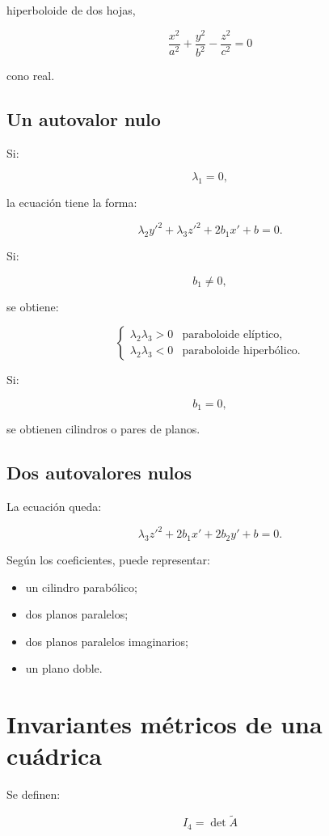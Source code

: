 \documentclass[11pt,a4paper]{article}
\begin{document}
hiperboloide de dos hojas,

\[
\boxed{
\frac{x^2}{a^2}
+
\frac{y^2}{b^2}
-
\frac{z^2}{c^2}
=
0
}
\]

cono real.

\subsection{Un autovalor nulo}

Si:

\[
\lambda_1=0,
\]

la ecuación tiene la forma:

\[
\lambda_2y'^2+\lambda_3z'^2+2b_1x'+b=0.
\]

Si:

\[
b_1\neq0,
\]

se obtiene:

\[
\boxed{
\begin{cases}
\lambda_2\lambda_3>0
& \text{paraboloide elíptico},\\
\lambda_2\lambda_3<0
& \text{paraboloide hiperbólico}.
\end{cases}
}
\]

Si:

\[
b_1=0,
\]

se obtienen cilindros o pares de planos.

\subsection{Dos autovalores nulos}

La ecuación queda:

\[
\lambda_3z'^2+2b_1x'+2b_2y'+b=0.
\]

Según los coeficientes, puede representar:

\begin{itemize}
\item un cilindro parabólico;
\item dos planos paralelos;
\item dos planos paralelos imaginarios;
\item un plano doble.
\end{itemize}

\section{Invariantes métricos de una cuádrica}

Se definen:

\[
\boxed{
I_4=\det\widetilde A
}
\]
\end{document}
